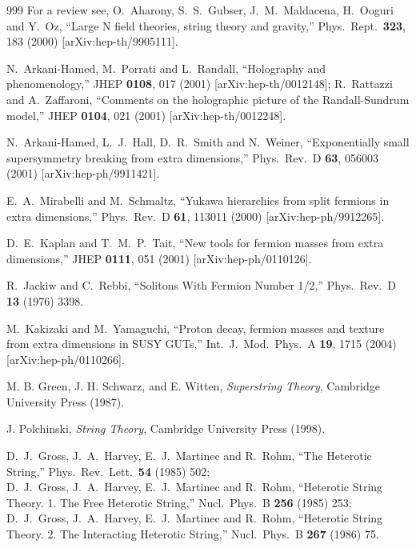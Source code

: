 \begin{thebibliography}{999}
For a review see, 
  O.~Aharony, S.~S.~Gubser, J.~M.~Maldacena, H.~Ooguri and Y.~Oz,
  ``Large N field theories, string theory and gravity,''
  Phys.\ Rept.\  {\bf 323}, 183 (2000)
  [arXiv:hep-th/9905111].

  N.~Arkani-Hamed, M.~Porrati and L.~Randall,
  ``Holography and phenomenology,''
  JHEP {\bf 0108}, 017 (2001)
  [arXiv:hep-th/0012148];
  R.~Rattazzi and A.~Zaffaroni,
  ``Comments on the holographic picture of the Randall-Sundrum model,''
  JHEP {\bf 0104}, 021 (2001)
  [arXiv:hep-th/0012248].

  N.~Arkani-Hamed, L.~J.~Hall, D.~R.~Smith and N.~Weiner,
  ``Exponentially small supersymmetry breaking from extra dimensions,''
  Phys.\ Rev.\ D {\bf 63}, 056003 (2001)
  [arXiv:hep-ph/9911421].

  E.~A.~Mirabelli and M.~Schmaltz,
  ``Yukawa hierarchies from split fermions in extra dimensions,''
  Phys.\ Rev.\ D {\bf 61}, 113011 (2000)
  [arXiv:hep-ph/9912265].

  D.~E.~Kaplan and T.~M.~P.~Tait,
  ``New tools for fermion masses from extra dimensions,''
  JHEP {\bf 0111}, 051 (2001)
  [arXiv:hep-ph/0110126].

  R.~Jackiw and C.~Rebbi,
  ``Solitons With Fermion Number 1/2,''
  Phys.\ Rev.\ D {\bf 13} (1976) 3398.

  M.~Kakizaki and M.~Yamaguchi,
  ``Proton decay, fermion masses and texture from extra dimensions in SUSY
  GUTs,''
  Int.\ J.\ Mod.\ Phys.\ A {\bf 19}, 1715 (2004)
  [arXiv:hep-ph/0110266].

M. B. Green, J. H. Schwarz, and E. Witten, {\it Superstring Theory}, 
Cambridge University Press (1987).

J. Polchinski,  {\it String Theory}, Cambridge  University Press (1998).

  D.~J.~Gross, J.~A.~Harvey, E.~J.~Martinec and R.~Rohm,
  ``The Heterotic String,''
  Phys.\ Rev.\ Lett.\  {\bf 54} (1985) 502;
\\
 D.~J.~Gross, J.~A.~Harvey, E.~J.~Martinec and R.~Rohm,
  ``Heterotic String Theory. 1. The Free Heterotic String,''
  Nucl.\ Phys.\ B {\bf 256} (1985) 253;
 \\
 D.~J.~Gross, J.~A.~Harvey, E.~J.~Martinec and R.~Rohm,
  ``Heterotic String Theory. 2. The Interacting Heterotic String,''
  Nucl.\ Phys.\ B {\bf 267} (1986) 75.


\end{thebibliography}
